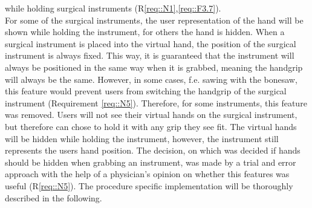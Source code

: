while holding surgical instruments (R\ref{req::N1},\ref{req::F3.7}).
\\ For some of the surgical instruments, the user representation of the hand will be shown while holding the instrument, for others the hand is hidden.
When a surgical instrument is placed into the virtual hand, the position of the surgical instrument is always fixed.
This way, it is guaranteed that the instrument will always be positioned in the same way when it is grabbed, meaning the handgrip will always be the same.
However, in some cases, f.e. sawing with the bonesaw, this feature would prevent users from switching the handgrip of the surgical instrument (Requirement \ref{req::N5}). 
Therefore, for some instruments, this feature was removed.
Users will not see their virtual hands on the surgical instrument, but therefore can chose to hold it with any grip they see fit.
The virtual hands will be hidden while holding the instrument, however, the instrument still represents the users hand position.
The decision, on which was decided if hands should be hidden when grabbing an instrument, was made by a trial and error approach with the help of a physician's opinion on whether 
this features was useful (R\ref{req::N5}).
The procedure specific implementation will be thoroughly described in the following.







